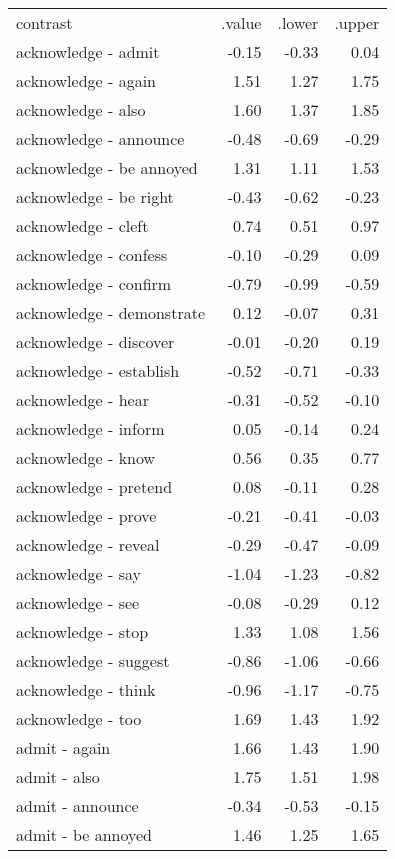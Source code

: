 \begin{longtable}{lrrr}
 contrast & .value & .lower & .upper \\ 
 acknowledge - admit & -0.15 & -0.33 & 0.04 \\ 
  acknowledge - again & 1.51 & 1.27 & 1.75 \\ 
  acknowledge - also & 1.60 & 1.37 & 1.85 \\ 
  acknowledge - announce & -0.48 & -0.69 & -0.29 \\ 
  acknowledge - be annoyed & 1.31 & 1.11 & 1.53 \\ 
  acknowledge - be right & -0.43 & -0.62 & -0.23 \\ 
  acknowledge - cleft & 0.74 & 0.51 & 0.97 \\ 
  acknowledge - confess & -0.10 & -0.29 & 0.09 \\ 
  acknowledge - confirm & -0.79 & -0.99 & -0.59 \\ 
  acknowledge - demonstrate & 0.12 & -0.07 & 0.31 \\ 
  acknowledge - discover & -0.01 & -0.20 & 0.19 \\ 
  acknowledge - establish & -0.52 & -0.71 & -0.33 \\ 
  acknowledge - hear & -0.31 & -0.52 & -0.10 \\ 
  acknowledge - inform & 0.05 & -0.14 & 0.24 \\ 
  acknowledge - know & 0.56 & 0.35 & 0.77 \\ 
  acknowledge - pretend & 0.08 & -0.11 & 0.28 \\ 
  acknowledge - prove & -0.21 & -0.41 & -0.03 \\ 
  acknowledge - reveal & -0.29 & -0.47 & -0.09 \\ 
  acknowledge - say & -1.04 & -1.23 & -0.82 \\ 
  acknowledge - see & -0.08 & -0.29 & 0.12 \\ 
  acknowledge - stop & 1.33 & 1.08 & 1.56 \\ 
  acknowledge - suggest & -0.86 & -1.06 & -0.66 \\ 
  acknowledge - think & -0.96 & -1.17 & -0.75 \\ 
  acknowledge - too & 1.69 & 1.43 & 1.92 \\ 
  admit - again & 1.66 & 1.43 & 1.90 \\ 
  admit - also & 1.75 & 1.51 & 1.98 \\ 
  admit - announce & -0.34 & -0.53 & -0.15 \\ 
  admit - be annoyed & 1.46 & 1.25 & 1.65 \\ 

\end{longtable}
